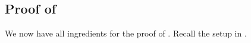 \documentclass[12 pt, reqno]{amsart}
\theoremstyle{definition}
\newcommand{\on}{\operatorname}
\newcommand{\p}{\mathsf{p}}
\begin{document}
  \subsection{Proof of }
  
  We now have all ingredients for the proof of .
  Recall the setup in .

\end{document}
